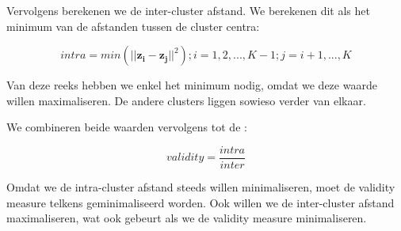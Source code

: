 Vervolgens berekenen we de inter-cluster afstand. We berekenen dit als het minimum van de afstanden tussen de cluster centra:

\begin{equation}
intra = min(\vert\vert \mathbf{z_i-z_j}\vert\vert^2) ; i = 1,2,...,K-1 ; j = i+1, ..., K
\end{equation}

Van deze reeks hebben we enkel het minimum nodig, omdat we deze waarde willen maximaliseren. De andere clusters liggen sowieso verder van elkaar.

We combineren beide waarden vervolgens tot de :

\begin{equation}
validity = \frac{intra}{inter}
\end{equation}

Omdat we de intra-cluster afstand steeds willen minimaliseren, moet de validity measure telkens geminimaliseerd worden. Ook willen we de inter-cluster afstand maximaliseren, wat ook gebeurt als we de validity measure minimaliseren.

